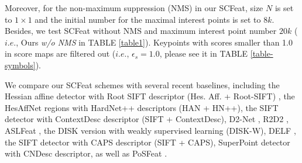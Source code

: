 \documentclass[journal]{IEEEtran}
\begin{document}
Moreover, for the non-maximum suppression (NMS) in our SCFeat, size $N$ is set to $1\times 1$ and the initial number for the maximal interest points is set to $8k$. Besides, we test SCFeat without NMS and maximum interest point number $20k$ ($i.e.$, Ours \textit{w/o NMS} in TABLE \ref{table1}). Keypoints with scores smaller than 1.0 in score maps are filtered out ($i.e.$, $\epsilon_{s}=1.0$, please see it in TABLE \ref{table-symbols}). 

We compare our SCFeat schemes with several recent baselines, including the Hessian affine detector with Root SIFT descriptor (Hes. Aff. + Root-SIFT) \cite{HesAffandSIFT}, the HesAffNet regions \cite{HesAffNet} with HardNet++ descriptors \cite{HardNetpp} (HAN + HN++), the SIFT detector with ContextDesc descriptor \cite{ContextDesc} (SIFT + ContextDesc), D2-Net \cite{D2net}, R2D2 \cite{R2D2}, ASLFeat \cite{aslfeat}, the DISK version \cite{disk} with weakly supervised learning  (DISK-W), DELF \cite{DELF}, the SIFT detector with CAPS descriptor \cite{caps} (SIFT + CAPS), SuperPoint \cite{SuperPoint} detector with CNDesc \cite{cndesc} descriptor, as well as PoSFeat \cite{li2022decoupling}.
\end{document}
